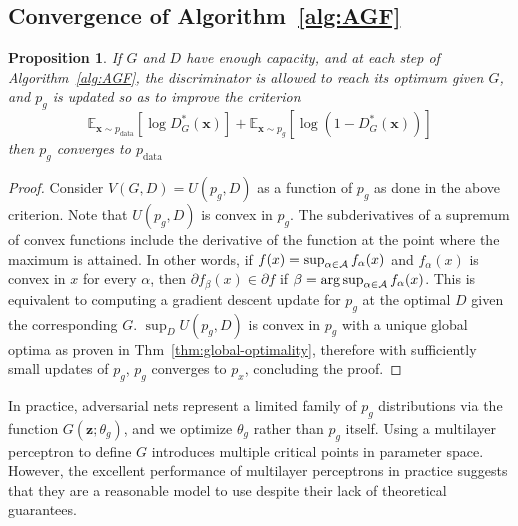 \documentclass{article} %
\newtheorem{proposition}{Proposition}
\begin{document}
\subsection{Convergence of Algorithm~\ref{alg:AGF}}
\label{sec:convergence-of-algorithm}



\begin{proposition}
If $G$ and $D$ have enough capacity, and at each step of Algorithm~\ref{alg:AGF}, the discriminator is allowed to reach its optimum given $G$, and $p_g$ is updated so as to improve the criterion $$\mathbb{E}_{\bm{x} \sim p_\text{data}}[\log D^*_G(\bm{x})] + \mathbb{E}_{\bm{x} \sim p_g}[\log (1 - D^*_G(\bm{x}))]$$ then $p_g$ converges to $p_\text{data}$
\end{proposition}

\begin{proof}
Consider $V(G,D)=U(p_g,D)$ as a function of $p_g$ as done in the above criterion. Note that $U(p_g,D)$ is convex in $p_g$. The subderivatives of a supremum of convex functions include the derivative of the function at the point where the maximum is attained. In other words, if $f(x) = \sup_{\alpha \in \cal{A}} f_\alpha(x)$ and $f_\alpha(x)$ is convex in $x$ for every $\alpha$, then $\partial f_\beta(x) \in \partial f$ if $\beta = \arg \sup_{\alpha \in \cal{A}} f_\alpha(x)$. This is equivalent to computing a gradient descent update for $p_g$ at the optimal $D$ given the corresponding $G$. $\sup_D U(p_g,D)$ is convex in $p_g$ with a unique global optima as proven in Thm~\ref{thm:global-optimality}, therefore with sufficiently small updates of $p_g$, $p_g$ converges to $p_x$, concluding the proof.
\end{proof}


In practice, adversarial nets represent a limited family of $p_g$ distributions via the function $G(\bm{z}; \theta_g)$,
and we optimize $\theta_g$ rather than $p_g$ itself. Using a multilayer perceptron to define $G$ introduces multiple
critical points in parameter space.
However, the excellent performance of multilayer
perceptrons in practice suggests that they are a reasonable model to use despite their lack of theoretical guarantees.
\end{document}

